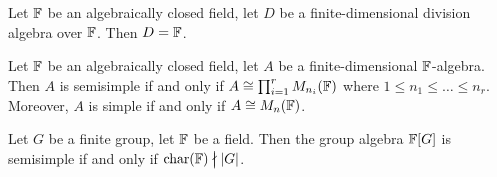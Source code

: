 
\lecture

\begin{lemma}\label{lemma:3.21}
Let $\mathbb{F}$ be an algebraically closed field, let $D$ be a
finite-dimensional division algebra over $\mathbb{F}$. Then $D=\mathbb{F}$.
\end{lemma}

\begin{corollary}\label{cor:3.22}
Let $\mathbb{F}$ be an algebraically closed field, let $A$ be a
finite-dimensional $\mathbb{F}$-algebra.
Then $A$ is semisimple if and only if
$A\cong\prod^{r}_{i=1}M_{n_{i}}(\mathbb{F})$ where $1\leq n_{1}\leq\dots\leq n_{r}$.
Moreover, $A$ is simple if and only if $A\cong M_{n}(\mathbb{F})$.
\end{corollary}

\begin{theorem}[Maschke]\label{thm:3.23}
Let $G$ be a finite group, let $\mathbb{F}$ be a field. Then the group
algebra $\mathbb{F}[G]$ is semisimple if and only if $\Char(\FF)\ndivides|G|$.
\end{theorem}

